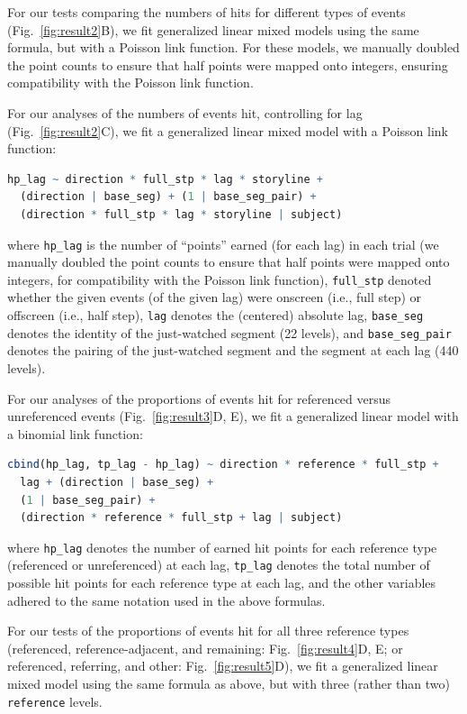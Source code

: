 \documentclass[10pt]{article}
\begin{document}
For our tests comparing the numbers of hits for different types of events
(Fig.~\ref{fig:result2}B), we fit generalized linear mixed models using the
same formula, but with a Poisson link function. For these models, we manually
doubled the point counts to ensure that half points were mapped onto integers,
ensuring compatibility with the Poisson link function.

For our analyses of the numbers of events hit, controlling for lag
(Fig.~\ref{fig:result2}C), we fit a generalized linear mixed model with a
Poisson link function:
\begin{lstlisting}[language=R]
  hp_lag ~ direction * full_stp * lag * storyline +
  (direction | base_seg) + (1 | base_seg_pair) +
  (direction * full_stp * lag * storyline | subject)
  \end{lstlisting}
where \texttt{hp\_lag} is the number of ``points'' earned (for each lag) in
each trial (we manually doubled the point counts to ensure that half points
were mapped onto integers, for compatibility with the Poisson link function),
\texttt{full\_stp} denoted whether the given events (of the given lag) were
onscreen (i.e., full step) or offscreen (i.e., half step), \texttt{lag} denotes
the (centered) absolute lag, \texttt{base\_seg} denotes the identity of the
just-watched segment (22 levels), and \texttt{base\_seg\_pair} denotes the
pairing of the just-watched segment and the segment at each lag (440 levels).

For our analyses of the proportions of events hit for referenced versus
unreferenced events (Fig.~\ref{fig:result3}D, E), we fit a generalized linear
model with a binomial link function:
\begin{lstlisting}[language=R]
  cbind(hp_lag, tp_lag - hp_lag) ~ direction * reference * full_stp +
  lag + (direction | base_seg) +
  (1 | base_seg_pair) +
  (direction * reference * full_stp + lag | subject)
\end{lstlisting}
where \texttt{hp\_lag} denotes the number of earned hit points for each
reference type (referenced or unreferenced) at each lag, \texttt{tp\_lag}
denotes the total number of possible hit points for each reference type at each
lag, and the other variables adhered to the same notation used in the above
formulas.

For our tests of the proportions of events hit for all three reference types
(referenced, reference-adjacent, and remaining: Fig.~\ref{fig:result4}D, E; or
referenced, referring, and other: Fig.~\ref{fig:result5}D), we fit a
generalized linear mixed model using the same formula as above, but with three
(rather than two) \texttt{reference} levels.
\end{document}
